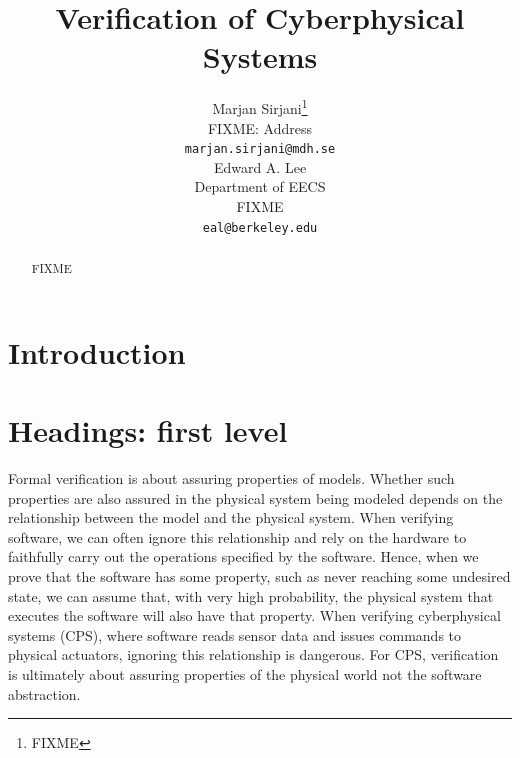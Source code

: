 \documentclass{article}
\title{Verification of Cyberphysical Systems}
\author{
  Marjan Sirjani\thanks{FIXME} \\
  FIXME: Address \\
  \texttt{marjan.sirjani@mdh.se} \\
   \And
 Edward A. Lee \\
  Department of EECS\\
  FIXME \\
  \texttt{eal@berkeley.edu} \\
}
\newcommand{\Marjan}[1]{{\color{darkgreen}\textbf{} #1}}
\begin{document}
\maketitle

\begin{abstract}
FIXME
\end{abstract}




\section{Introduction}

\section{Headings: first level}
\label{sec:headings}

Formal verification is about assuring properties of models.
Whether such properties are also assured in the physical system being modeled
depends on the relationship between the model and 
\Marjan{the}
physical system.
When verifying software, we can often ignore this relationship and rely on the hardware to
faithfully carry out the operations specified by the software.
Hence, when we prove that the software has some property, such as never reaching some undesired state,
we can assume that, with very high probability, the physical system that executes the software will
also have that property.
When verifying cyberphysical systems (CPS), where software reads sensor data and issues commands to physical
actuators, ignoring this relationship is dangerous.
For CPS, verification is ultimately about assuring properties of the physical world
not the software abstraction.
\end{document}
